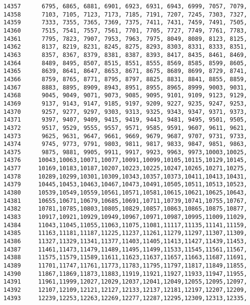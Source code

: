 \begin{Code}
\begin{verbatim}
14357      6795, 6865, 6881, 6901, 6923, 6931, 6943, 6999, 7057, 7079,
14358      7103, 7105, 7123, 7173, 7185, 7191, 7207, 7245, 7303, 7327, 
14359      7333, 7355, 7365, 7369, 7375, 7411, 7431, 7459, 7491, 7505, 
14360      7515, 7541, 7557, 7561, 7701, 7705, 7727, 7749, 7761, 7783,
14361      7795, 7823, 7907, 7953, 7963, 7975, 8049, 8089, 8123, 8125,
14362      8137, 8219, 8231, 8245, 8275, 8293, 8303, 8331, 8333, 8351,
14363      8357, 8367, 8379, 8381, 8387, 8393, 8417, 8435, 8461, 8469,
14364      8489, 8495, 8507, 8515, 8551, 8555, 8569, 8585, 8599, 8605,
14365      8639, 8641, 8647, 8653, 8671, 8675, 8689, 8699, 8729, 8741,
14366      8759, 8765, 8771, 8795, 8797, 8825, 8831, 8841, 8855, 8859,
14367      8883, 8895, 8909, 8943, 8951, 8955, 8965, 8999, 9003, 9031,
14368      9045, 9049, 9071, 9073, 9085, 9095, 9101, 9109, 9123, 9129,
14369      9137, 9143, 9147, 9185, 9197, 9209, 9227, 9235, 9247, 9253,
14370      9257, 9277, 9297, 9303, 9313, 9325, 9343, 9347, 9371, 9373,
14371      9397, 9407, 9409, 9415, 9419, 9443, 9481, 9495, 9501, 9505,
14372      9517, 9529, 9555, 9557, 9571, 9585, 9591, 9607, 9611, 9621,
14373      9625, 9631, 9647, 9661, 9669, 9679, 9687, 9707, 9731, 9733,
14374      9745, 9773, 9791, 9803, 9811, 9817, 9833, 9847, 9851, 9863,
14375      9875, 9881, 9905, 9911, 9917, 9923, 9963, 9973,10003,10025,
14376     10043,10063,10071,10077,10091,10099,10105,10115,10129,10145,
14377     10169,10183,10187,10207,10223,10225,10247,10265,10271,10275,
14378     10289,10299,10301,10309,10343,10357,10373,10411,10413,10431,
14379     10445,10453,10463,10467,10473,10491,10505,10511,10513,10523,
14380     10539,10549,10559,10561,10571,10581,10615,10621,10625,10643,
14381     10655,10671,10679,10685,10691,10711,10739,10741,10755,10767,
14382     10781,10785,10803,10805,10829,10857,10863,10865,10875,10877,
14383     10917,10921,10929,10949,10967,10971,10987,10995,11009,11029,
14384     11043,11045,11055,11063,11075,11081,11117,11135,11141,11159,
14385     11163,11181,11187,11225,11237,11261,11279,11297,11307,11309,
14386     11327,11329,11341,11377,11403,11405,11413,11427,11439,11453,
14387     11461,11473,11479,11489,11495,11499,11533,11545,11561,11567,
14388     11575,11579,11589,11611,11623,11637,11657,11663,11687,11691,
14389     11701,11747,11761,11773,11783,11795,11797,11817,11849,11855,
14390     11867,11869,11873,11883,11919,11921,11927,11933,11947,11955,
14391     11961,11999,12027,12029,12037,12041,12049,12055,12095,12097,
14392     12107,12109,12121,12127,12133,12137,12181,12197,12207,12209,
14393     12239,12253,12263,12269,12277,12287,12295,12309,12313,12335,

\end{verbatim}
\end{Code}
